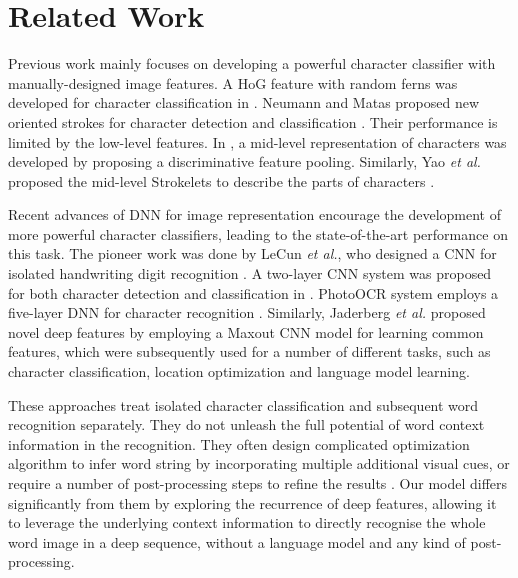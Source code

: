 \documentclass[letterpaper]{article}
\begin{document}
\section{Related Work}
Previous work mainly focuses on developing a powerful character classifier with manually-designed image features.
A HoG feature with random ferns was developed for character classification in \cite{Wang2011}. Neumann and Matas proposed new oriented strokes for character detection and classification \cite{Neumann2013}.
Their performance is limited by the low-level features. In \cite{Lee2014}, a mid-level representation of characters was developed by proposing a discriminative feature pooling. Similarly, Yao \emph{et al.} proposed the mid-level Strokelets to describe the parts of characters \cite{Yao2014}.


Recent advances of DNN for image representation encourage the development of more powerful character classifiers, leading to the state-of-the-art performance on this task. The pioneer work was done by LeCun \emph{et al.}, who designed a CNN for isolated handwriting digit recognition \cite{LeCun1998}. A two-layer CNN system was proposed for both character detection and classification in \cite{Wang2012}. PhotoOCR system employs a five-layer DNN for character recognition \cite{Bissacco2013}. Similarly, Jaderberg \emph{et al.} \cite{Jaderberg2014} proposed novel deep features by employing a Maxout CNN model for learning common features, which were subsequently used for a number of different tasks, such as character classification, location optimization and language model learning.

These approaches treat isolated character classification and subsequent word recognition separately. They do not unleash the full potential of word context information in the recognition. They often design complicated optimization algorithm to infer word string by incorporating multiple additional visual cues, or require a number of post-processing steps to refine the results \cite{Jaderberg2014,Bissacco2013}. Our model differs significantly from them by exploring the recurrence of deep features, allowing it to leverage the underlying context information to directly recognise the whole word image in a deep sequence, without a language model and any kind of post-processing.
\end{document}
